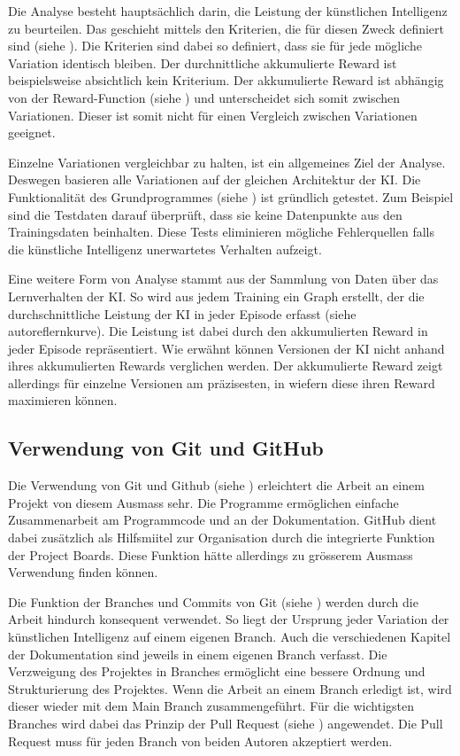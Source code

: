 Die Analyse besteht hauptsächlich darin, die Leistung der künstlichen
Intelligenz zu beurteilen. Das geschieht mittels den Kriterien, die für diesen
Zweck definiert sind (siehe ). Die Kriterien sind dabei so
definiert, dass sie für jede mögliche Variation identisch bleiben. Der
durchnittliche akkumulierte Reward ist beispielsweise absichtlich kein
Kriterium. Der akkumulierte Reward  ist abhängig von der Reward-Function (siehe
) und unterscheidet sich somit zwischen Variationen.
Dieser ist somit nicht für einen Vergleich zwischen Variationen geeignet.

Einzelne Variationen vergleichbar zu halten, ist ein allgemeines Ziel der 
Analyse. Deswegen basieren alle Variationen auf der gleichen Architektur der KI.
Die Funktionalität des Grundprogrammes (siehe ) ist
gründlich getestet. Zum Beispiel sind die Testdaten darauf überprüft, dass sie
keine Datenpunkte aus den Trainingsdaten beinhalten. Diese Tests eliminieren
mögliche Fehlerquellen falls die künstliche Intelligenz unerwartetes Verhalten
aufzeigt.

Eine weitere Form von Analyse stammt aus der Sammlung von Daten über das
Lernverhalten der KI. So wird aus jedem Training ein Graph erstellt, der die
durchschnittliche Leistung der KI in jeder Episode erfasst (siehe
autoref{lernkurve}). Die Leistung ist dabei durch den akkumulierten Reward in
jeder Episode repräsentiert. Wie erwähnt können Versionen der KI nicht anhand
ihres akkumulierten Rewards verglichen werden. Der akkumulierte Reward zeigt
allerdings für einzelne Versionen am präzisesten, in wiefern diese ihren Reward
maximieren können.


\subsection{Verwendung von Git und GitHub}\label{sub:d_reflex_git}
Die Verwendung von Git und Github (siehe ) erleichtert die
Arbeit an einem Projekt von diesem Ausmass sehr. Die Programme ermöglichen
einfache Zusammenarbeit am Programmcode und an der Dokumentation. GitHub dient
dabei zusätzlich als Hilfsmiitel zur Organisation durch die integrierte Funktion
der Project Boards. Diese Funktion hätte allerdings zu grösserem Ausmass
Verwendung finden können.

Die Funktion der Branches und Commits von Git (siehe )
werden durch die Arbeit hindurch konsequent verwendet. So liegt der Ursprung
jeder Variation der künstlichen Intelligenz auf einem eigenen Branch. Auch die
verschiedenen Kapitel der Dokumentation sind jeweils in einem eigenen Branch
verfasst. Die Verzweigung des Projektes in Branches ermöglicht eine bessere
Ordnung und Strukturierung des Projektes. Wenn die Arbeit an einem Branch
erledigt ist, wird dieser wieder mit dem Main Branch zusammengeführt. Für die
wichtigsten Branches wird dabei das Prinzip der Pull Request (siehe
) angewendet. Die Pull Request muss für jeden Branch von
beiden Autoren akzeptiert werden.


